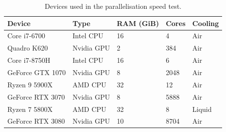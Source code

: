 \documentclass{jors}
\begin{document}
			\begin{table}[h!]
				\caption{Devices used in the parallelisation speed test.}
				\label{tab:devices}
				\begin{tabular}{l|l|l|l|l}
					\textbf{Device}	&\textbf{Type}	&\textbf{RAM (GiB)}	&\textbf{Cores}	&\textbf{Cooling}\\
					\hline
					Core i7-6700	&Intel CPU		&16					&4				&Air\\
					Quadro K620		&Nvidia GPU		&2					&384			&Air\\
					\hline
					Core i7-8750H	&Intel CPU		&16					&6				&Air\\
					GeForce GTX 1070&Nvidia GPU		&8					&2048			&Air\\
					\hline
					Ryzen 9 5900X	&AMD CPU		&32					&12				&Air\\
					GeForce RTX 3070&Nvidia GPU		&8					&5888			&Air\\
					\hline
					Ryzen 7 5800X	&AMD CPU		&32					&8				&Liquid\\
					GeForce RTX 3080&Nvidia GPU		&10					&8704			&Air\\
				\end{tabular}
			\end{table}


\end{document}
